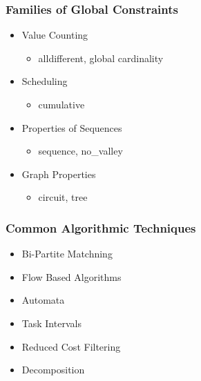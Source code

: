\begin{frame}
\frametitle{Families of Global Constraints}
\begin{itemize}
\item Value Counting
\begin{itemize}
\item alldifferent, global cardinality
\end{itemize}
\item Scheduling
\begin{itemize}
\item cumulative
\end{itemize}
\item Properties of Sequences 
\begin{itemize}
\item sequence, no\_valley 
\end{itemize}
\item Graph Properties
\begin{itemize}
\item circuit, tree
\end{itemize}
\end{itemize}
\end{frame}

\begin{frame}
\frametitle{Common Algorithmic Techniques}
\begin{itemize}
\item Bi-Partite Matchning
\item Flow Based Algorithms
\item Automata
\item Task Intervals
\item Reduced Cost Filtering
\item Decomposition
\end{itemize}
\end{frame}
